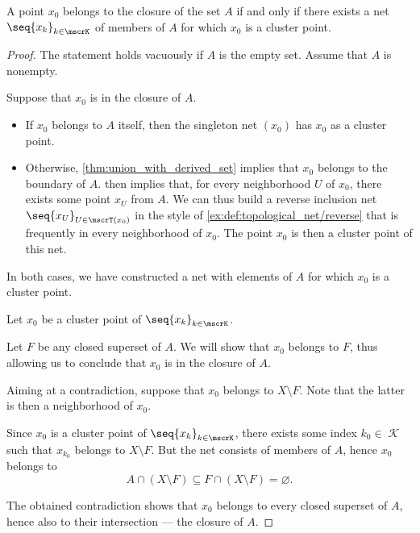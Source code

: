 \begin{proposition}\label{thm:cluster_point_iff_in_closure}
  A point \( x_0 \) belongs to the closure of the set \( A \) if and only if there exists a net \( \seq{ x_k }_{k \in \mscrK} \) of members of \( A \) for which \( x_0 \) is a cluster point.
\end{proposition}
\begin{proof}
  The statement holds vacuously if \( A \) is the empty set. Assume that \( A \) is nonempty.

  \SufficiencySubProof Suppose that \( x_0 \) is in the closure of \( A \).
  \begin{itemize}
    \item If \( x_0 \) belongs to \( A \) itself, then the singleton net \( (x_0) \) has \( x_0 \) as a cluster point.
    \item Otherwise, \cref{thm:union_with_derived_set} implies that \( x_0 \) belongs to the boundary of \( A \).  then implies that, for every neighborhood \( U \) of \( x_0 \), there exists some point \( x_U \) from \( A \). We can thus build a reverse inclusion net \( \seq{ x_U }_{U \in \mscrT(x_0)} \) in the style of \cref{ex:def:topological_net/reverse} that is frequently in every neighborhood of \( x_0 \). The point \( x_0 \) is then a cluster point of this net.
  \end{itemize}

  In both cases, we have constructed a net with elements of \( A \) for which \( x_0 \) is a cluster point.

  \NecessitySubProof Let \( x_0 \) be a cluster point of \( \seq{ x_k }_{k \in \mscrK} \).

  Let \( F \) be any closed superset of \( A \). We will show that \( x_0 \) belongs to \( F \), thus allowing us to conclude that \( x_0 \) is in the closure of \( A \).

  Aiming at a contradiction, suppose that \( x_0 \) belongs to \( X \setminus F \). Note that the latter is then a neighborhood of \( x_0 \).

  Since \( x_0 \) is a cluster point of \( \seq{ x_k }_{k \in \mscrK} \), there exists some index \( k_0 \in \mscrK \) such that \( x_{k_0} \) belongs to \( X \setminus F \). But the net consists of members of \( A \), hence \( x_0 \) belongs to
  \begin{equation*}
    A \cap (X \setminus F) \subseteq F \cap (X \setminus F) = \varnothing.
  \end{equation*}

  The obtained contradiction shows that \( x_0 \) belongs to every closed superset of \( A \), hence also to their intersection --- the closure of \( A \).
\end{proof}

